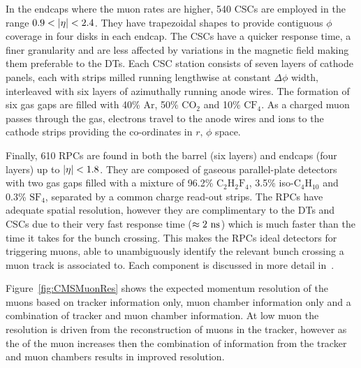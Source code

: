 In the endcaps where the muon rates are higher, 540 CSCs are employed in the range $0.9<\lvert \eta \rvert<2.4$. 
They have trapezoidal shapes to provide contiguous $\phi$ coverage in four disks in each endcap.
The CSCs have a quicker response time, a finer granularity and are less affected by variations in the magnetic field making them preferable to the DTs.
Each CSC station consists of seven layers of cathode panels, each with strips milled running lengthwise at constant $\Delta\phi$ width, interleaved with six layers of azimuthally running anode wires.
The formation of six gas gaps are filled with 40\% $\mathrm{Ar}$, 50\% $\mathrm{CO}_{2}$ and 10\% $\mathrm{CF}_{4}$.
As a charged muon passes through the gas, electrons travel to the anode wires and ions to the cathode strips providing the co-ordinates in $r,\,\phi$ space.

Finally, 610 RPCs are found in both the barrel (six layers) and endcaps (four layers) up to $\lvert \eta \rvert<1.8$.
They are composed of gaseous parallel-plate detectors with two gas gaps filled with a mixture of 96.2\% $\mathrm{C}_{2}\mathrm{H}_{2}\mathrm{F}_{4}$, 3.5\% iso-$\mathrm{C}_{4}\mathrm{H}_{10}$ and 0.3\% $\mathrm{SF}_{4}$, separated by a common charge read-out strips.
The RPCs have adequate spatial resolution, however they are complimentary to the DTs and CSCs due to their very fast response time ($\approx2\mathrm{~ns}^{}$) which is much faster than the time it takes for the bunch crossing.
This makes the RPCs ideal detectors for triggering muons, able to unambiguously identify the relevant bunch crossing a muon track is associated to.
Each component is discussed in more detail in~\cite{CMSExperiment,CMSMuon}.

Figure~\ref{fig:CMSMuonRes} shows the expected momentum resolution of the muons based on tracker information only, muon chamber information only and a combination of tracker and muon chamber information.
At low muon \pt{} the resolution is driven from the reconstruction of muons in the tracker, however as the \pt{} of the muon increases then the combination of information from the tracker and muon chambers results in improved resolution.

